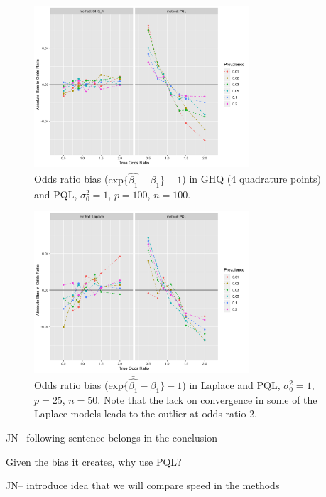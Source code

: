 \documentclass{article}
\begin{document}
\begin{flushleft}
\begin{figure}[]
\begin{center}
\includegraphics[width=8cm]{_bias_pql_ghq4.png}
  \caption{Odds ratio bias ($\text{exp} \{ \bar{\hat{\beta_1}} - \beta_1 \} - 1$) in GHQ (4 quadrature points) and PQL, $\sigma^2_0=1$, $p=100$, $n=100$.}
  \label{fig:_bias_pql_ghq4}
\end{center}
\end{figure}

\begin{figure}[]
\begin{center}
\includegraphics[width=8cm]{_bias_pql_lap.png}
  \caption{Odds ratio bias ($\text{exp} \{ \bar{\hat{\beta_1}} - \beta_1 \} - 1$) in Laplace and PQL, $\sigma^2_0=1$, $p=25$, $n=50$. Note that the lack on convergence in some of the Laplace models leads to the outlier at odds ratio 2.}
  \label{fig:_bias_pql_lap}
\end{center}
\end{figure}


JN-- following sentence belongs in the conclusion

Given the bias it creates, why use PQL? 

JN-- introduce idea that we will compare speed in the methods


\end{flushleft}
\end{document}
